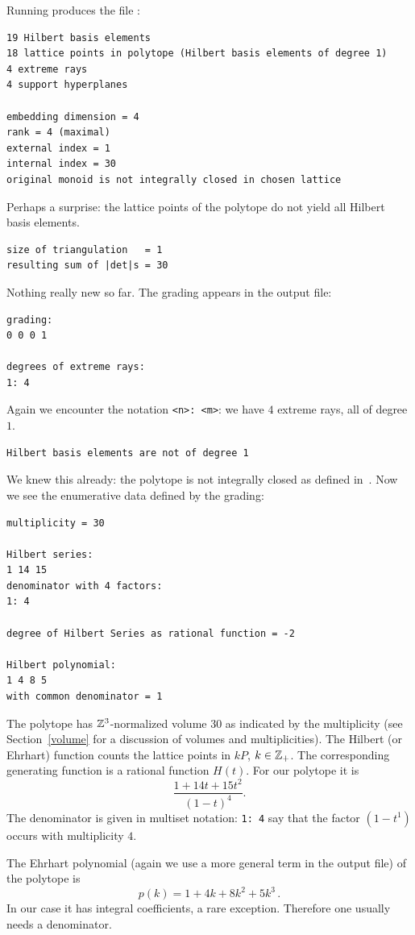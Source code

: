 Running  produces the file :
\begin{Verbatim}
19 Hilbert basis elements
18 lattice points in polytope (Hilbert basis elements of degree 1)
4 extreme rays
4 support hyperplanes

embedding dimension = 4
rank = 4 (maximal)
external index = 1
internal index = 30
original monoid is not integrally closed in chosen lattice
\end{Verbatim}
Perhaps a surprise: the lattice points of the polytope do not yield all Hilbert basis elements.
\begin{Verbatim}
size of triangulation   = 1
resulting sum of |det|s = 30
\end{Verbatim}
Nothing really new so far. The grading appears in the output file:
\begin{Verbatim}
grading:
0 0 0 1 

degrees of extreme rays:
1: 4
\end{Verbatim}
Again we encounter the notation \verb|<n>: <m>|: we have $4$ extreme rays, all of degree $1$.
\begin{Verbatim}
Hilbert basis elements are not of degree 1
\end{Verbatim}
We knew this already: the polytope is not integrally closed as defined in~\cite{BG}. Now we see the enumerative data defined by the grading:
\begin{Verbatim}
multiplicity = 30

Hilbert series:
1 14 15 
denominator with 4 factors:
1: 4  

degree of Hilbert Series as rational function = -2

Hilbert polynomial:
1 4 8 5 
with common denominator = 1
\end{Verbatim}
The polytope has ${\mathbb Z}^3$-normalized volume $30$ as indicated by the multiplicity (see Section~\ref{volume} for a discussion of volumes and multiplicities). The Hilbert (or Ehrhart) function counts the lattice points in $kP$, $k\in{\mathbb Z}_+$. The corresponding generating function is a
rational function $H(t)$. For our polytope it is
$$
\frac{1+14t+15t^2}{(1-t)^4}.
$$
The denominator is given in multiset notation: \verb|1: 4| say that the factor $(1-t^1)$ occurs with multiplicity $4$.

The Ehrhart polynomial (again we use a more general term in
the output file) of the polytope is
$$
p(k)=1+4k+8k^2+5k^3\,.
$$
In our case it has integral coefficients, a rare exception. Therefore one usually needs a denominator.

